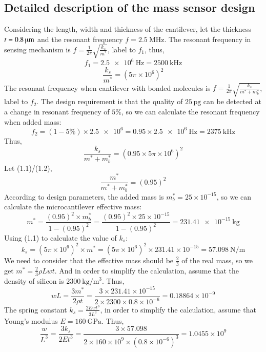 \documentclass[a4paper,12pt,reqno]{report}
\begin{document}
    \subsection{Detailed description of the mass sensor design}
    \label{sec:Detailed description of the mass sensor design}
        Considering the length, width and thickness of the cantilever, let the thickness 
        $t=0.8\,\muup\unit{\m}$ and the resonant frequency $f=\qty{2.5}{\MHz}$.
        The resonant frequency in sensing mechanism is $f=\frac{1}{2 \pi}\sqrt{\frac{k_s}{m^*}}$, label to $f_1$, thus,
        $$f_1=\qty{2.5e6}{\hertz}=\qty{2500}{\kilo\hertz}$$
        \begin{equation}
            \frac{k_s}{m^*}=(5\pi\times10^6)^2 \tag{1.1}
        \end{equation}
        The resonant frequency when cantilever with bonded molecules is $f=\frac{1}{2\pi}\sqrt{\frac{k_s}{m^*+m_b^*}}$,  label to $f_2$.
        The design requirement is that the quality of $25\,\unit{\pg}$ can be detected at a change in resonant frequency of $5\%$, so we can calculate the resonant frequency when added mass:
        $$f_2=(1-5\%)\times\qty{2.5e6}=0.95\times\qty{2.5e6}{\hertz}=\qty{2375}{\kilo\hertz}$$
        Thus,
        \begin{equation}
            \frac{k_s}{m^*+m_b^*}=(0.95\times5\pi\times10^6)^2 \tag{1.2}
        \end{equation}
        Let (1.1)/(1.2),
        $$\frac{m^*}{m^*+m_b^*}=(0.95)^2$$
        According to design parameters, the added mass is $m_b^*=25\times10^{-15}$, so we can calculate the microcantilever effective mass:
        $$m^*=\frac{(0.95)^2\times m_b^*}{1-(0.95)^2}=\frac{(0.95)^2\times25\times10^{-15}}{1-(0.95)^2}=\qty{231.41e-15}{\kilo\gram}$$
        Using (1.1) to calculate the value of $k_s$:
        $$k_s=(5\pi\times10^6)^2\times m^*=(5\pi\times10^6)^2\times231.41\times10^{-15}=\qty{57.098}{\N/\m}$$
        We need to consider that the effective mass should be $\frac{2}{3}$ of the real mass, so we get $m^*=\frac{2}{3} \rho Lwt$. 
        And in order to simplify the calculation, assume that the density of silicon is $\qty{2300}{\kg\per\m^3}$. Thus,
        $$wL=\frac{3m^*}{2 \rho t}=\frac{3\times231.41\times10^{-15}}{2\times2300\times0.8\times10^{-6}}=0.18864\times10^{-9}$$
        The spring constant $k_s=\frac{2Ewt^3}{3L^3}$, in order to simplify the calculation, assume that Young's modulus $E=\qty{160}{\GPa}$. Thus,
        \begin{equation}
            \frac{w}{L^3}=\frac{3k_s}{2Et^3}=\frac{3\times57.098}{2\times160\times10^9\times(0.8\times10^{-6})^3}=1.0455\times10^9 \tag{1.3} \label{fomula.1.3}
        \end{equation}
\end{document}
